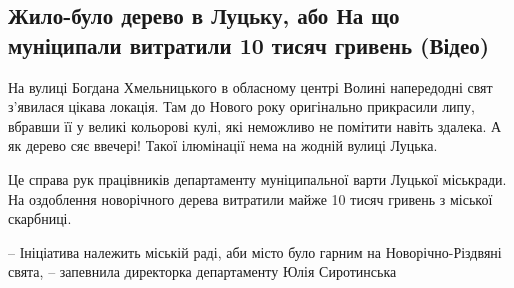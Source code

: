  
 
 
 
 
\subsection{Жило-було дерево в Луцьку, або На що муніципали витратили 10 тисяч гривень (Відео)}
\label{sec:21_12_2021.stz.news.ua.volyn.1.derevo_luck}


На вулиці Богдана Хмельницького в обласному центрі Волині напередодні свят
з’явилася цікава локація. Там до Нового року оригінально прикрасили липу,
вбравши її у великі кольорові кулі, які неможливо не помітити навіть здалека. А
як дерево сяє ввечері! Такої ілюмінації нема на жодній вулиці Луцька.

Це справа рук працівників департаменту муніципальної варти Луцької міськради.
На оздоблення новорічного дерева витратили майже 10 тисяч гривень з міської
скарбниці. 

– Ініціатива належить міській раді, аби місто було гарним на Новорічно-Різдвяні
свята, – запевнила директорка департаменту Юлія Сиротинська
